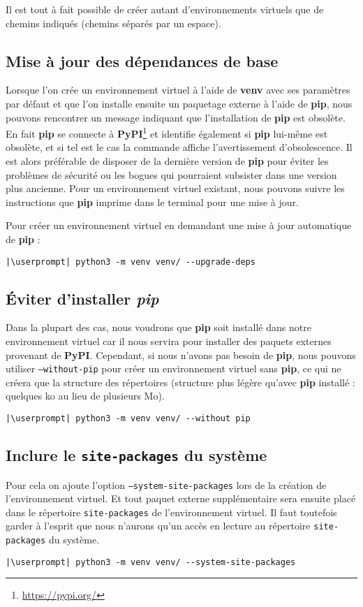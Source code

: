 Il est tout à fait possible de créer autant d'environnements virtuels que de chemins indiqués (chemins séparés par un espace).

\subsection*{Mise à jour des dépendances de base}
Lorsque l'on crée un environnement virtuel à l'aide de \textbf{venv} avec ses paramètres par défaut et que l'on installe ensuite un paquetage externe à l'aide de \textbf{pip}, nous pouvons rencontrer un message indiquant que l'installation de \textbf{pip} est obsolète. En fait \textbf{pip} se connecte à \textbf{PyPI}\footnote{\url{https://pypi.org/}} et identifie également si \textbf{pip} lui-même est obsolète, et si tel est le cas la commande affiche l'avertissement d'obsolescence.  Il est alors préférable de disposer de la dernière version de \textbf{pip} pour éviter les problèmes de sécurité ou les bogues qui pourraient subsister dans une version plus ancienne. Pour un environnement virtuel existant, nous pouvons suivre les instructions que \textbf{pip} imprime dans le terminal pour une mise à jour.

Pour créer un environnement virtuel en demandant une mise à jour automatique de \textbf{pip} :
\begin{lstlisting}[style=bash]
|\userprompt| python3 -m venv venv/ --upgrade-deps
\end{lstlisting}

\subsection*{Éviter d'installer \textit{pip}}
Dans la plupart des cas, nous voudrons que \textbf{pip} soit installé dans notre environnement virtuel car il nous servira pour installer des paquets externes provenant de \textbf{PyPI}. Cependant, si nous n'avons pas besoin de \textbf{pip}, nous pouvons utiliser \texttt{--without-pip} pour créer un environnement virtuel sans \textbf{pip}, ce qui ne créera que la structure des répertoires (structure plus légère qu'avec \textbf{pip} installé : quelques ko au lieu de plusieurs Mo).
\begin{lstlisting}[style=bash]
|\userprompt| python3 -m venv venv/ --without pip
\end{lstlisting}

\subsection*{Inclure le \texttt{site-packages} du système}
Pour cela on ajoute l'option \texttt{--system-site-packages} lors de la création de l'environnement virtuel. Et tout paquet externe supplémentaire sera ensuite placé dans le répertoire \texttt{site-packages} de l'environnement virtuel. Il faut toutefois garder à l'esprit que nous n'aurons qu'un accès en lecture au répertoire \texttt{site-packages} du système.
\begin{lstlisting}[style=bash]
|\userprompt| python3 -m venv venv/ --system-site-packages
\end{lstlisting}

